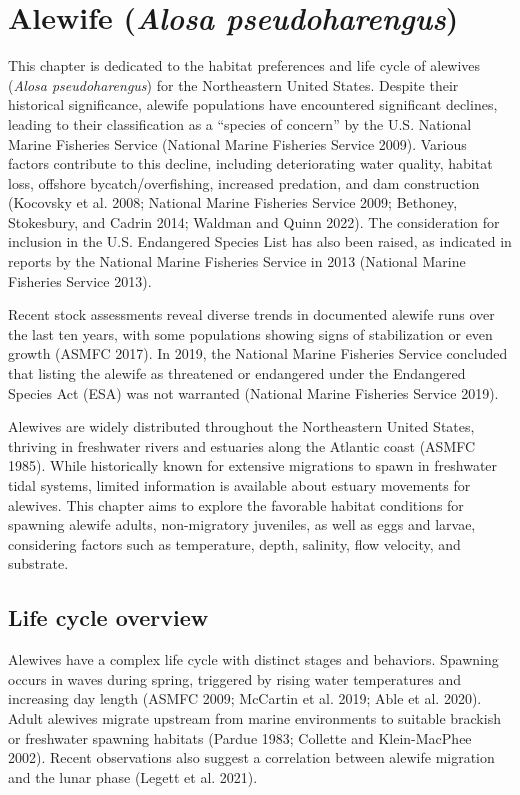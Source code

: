 \documentclass[
]{book}
\begin{document}
\hypertarget{alewife}{%
\chapter{\texorpdfstring{Alewife (\emph{Alosa pseudoharengus})}{Alewife (Alosa pseudoharengus)}}\label{alewife}}

This chapter is dedicated to the habitat preferences and life cycle of alewives (\emph{Alosa pseudoharengus}) for the Northeastern United States. Despite their historical significance, alewife populations have encountered significant declines, leading to their classification as a ``species of concern'' by the U.S. National Marine Fisheries Service (National Marine Fisheries Service 2009). Various factors contribute to this decline, including deteriorating water quality, habitat loss, offshore bycatch/overfishing, increased predation, and dam construction (Kocovsky et al. 2008; National Marine Fisheries Service 2009; Bethoney, Stokesbury, and Cadrin 2014; Waldman and Quinn 2022). The consideration for inclusion in the U.S. Endangered Species List has also been raised, as indicated in reports by the National Marine Fisheries Service in 2013 (National Marine Fisheries Service 2013).

Recent stock assessments reveal diverse trends in documented alewife runs over the last ten years, with some populations showing signs of stabilization or even growth (ASMFC 2017). In 2019, the National Marine Fisheries Service concluded that listing the alewife as threatened or endangered under the Endangered Species Act (ESA) was not warranted (National Marine Fisheries Service 2019).

Alewives are widely distributed throughout the Northeastern United States, thriving in freshwater rivers and estuaries along the Atlantic coast (ASMFC 1985). While historically known for extensive migrations to spawn in freshwater tidal systems, limited information is available about estuary movements for alewives. This chapter aims to explore the favorable habitat conditions for spawning alewife adults, non-migratory juveniles, as well as eggs and larvae, considering factors such as temperature, depth, salinity, flow velocity, and substrate.

\hypertarget{life-cycle-overview}{%
\section{Life cycle overview}\label{life-cycle-overview}}

Alewives have a complex life cycle with distinct stages and behaviors. Spawning occurs in waves during spring, triggered by rising water temperatures and increasing day length (ASMFC 2009; McCartin et al. 2019; Able et al. 2020). Adult alewives migrate upstream from marine environments to suitable brackish or freshwater spawning habitats (Pardue 1983; Collette and Klein-MacPhee 2002). Recent observations also suggest a correlation between alewife migration and the lunar phase (Legett et al. 2021).
\end{document}
